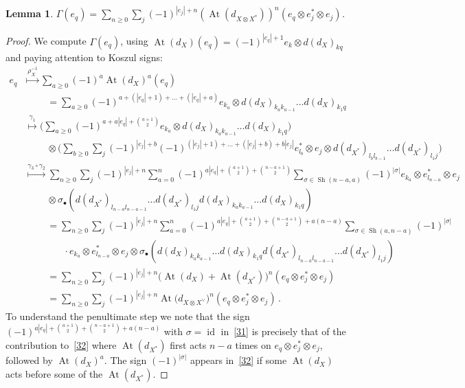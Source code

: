 \documentclass{compositio}
\newtheorem{lemma}[theorem]{Lemma}
\theoremstyle{definition}
\numberwithin{equation}{section}
\DeclareMathOperator{\At}{At}
\DeclareMathOperator{\Sh}{Sh}
\begin{document}
\begin{lemma}
$\Gamma(e_q) = \sum_{n\geq 0} \sum_j (-1)^{|e_j| + n} (\At(d_{X\otimes X^*}))^n(e_q \otimes e_j^* \otimes e_j)$. 
\end{lemma}

\begin{proof}
We compute $\Gamma(e_q)$, using $\At(d_X)(e_q) = (-1)^{|e_q|+1} e_k \otimes d(d_X)_{kq}$ and paying attention to Koszul signs: 
\begin{align}
e_q & \stackrel{\rho_X^{-1}}{\longmapsto} \sum_{a\geq 0} (-1)^a \At(d_X)^a(e_q) \nonumber \\
& \qquad\; = \sum_{a\geq 0} (-1)^{a + (|e_q|+1)+\ldots+(|e_q|+a)} e_{k_a} \otimes d(d_X)_{k_a k_{a-1}} \ldots d(d_X)_{k_1 q} \nonumber \\
& \stackrel{\gamma_1}{\longmapsto} \Big( \sum_{a\geq 0} (-1)^{a + a|e_q| + {a+1\choose 2}} e_{k_a} \otimes d(d_X)_{k_a k_{a-1}} \ldots d(d_X)_{k_1 q} \Big) \nonumber \\
& \qquad\; \otimes \Big( \sum_{b\geq 0} \sum_j (-1)^{|e_j|+b} (-1)^{(|e_j|+1)+\ldots+(|e_j|+b) + b|e_j|} e^*_{l_b} \otimes e_j \otimes d(d_{X^*})_{l_b l_{b-1}} \ldots d(d_{X^*})_{l_1 j} \Big) \nonumber \\
& \stackrel{\gamma_3 \circ \gamma_2}{\longmapsto} \sum_{n\geq 0} \sum_j (-1)^{|e_j|+n} \sum_{a=0}^n(-1)^{a|e_q| + {a+1\choose 2} + {n-a+1\choose 2}} \sum_{\sigma \in \Sh(n-a,a)} (-1)^{|\sigma|} e_{k_a} \otimes e^*_{l_{n-a}} \otimes e_j \nonumber \\
& \qquad\;   \otimes \sigma_\bullet \left( d(d_{X^*})_{l_{n-a} l_{n-a-1}} \ldots d(d_{X^*})_{l_1 j} d(d_X)_{k_a k_{a-1}} \ldots d(d_X)_{k_1 q} \right) \nonumber \\
& \qquad\; =  \sum_{n\geq 0} \sum_j (-1)^{|e_j|+n} \sum_{a=0}^n (-1)^{a|e_q| + {a+1\choose 2} + {n-a+1\choose 2} + a(n-a)} \sum_{\sigma \in \Sh(a,n-a)} (-1)^{|\sigma|}  \label{31} \\
& \qquad\qquad \cdot e_{k_a} \otimes e^*_{l_{n-a}} \otimes e_j \otimes \sigma_\bullet \left( d(d_X)_{k_a k_{a-1}} \ldots d(d_X)_{k_1 q} d(d_{X^*})_{l_{n-a} l_{n-a-1}} \ldots d(d_{X^*})_{l_1 j} \right) \nonumber \\
& \qquad\; =  \sum_{n\geq 0} \sum_j (-1)^{|e_j|+n} \big( \At(d_X) + \At(d_{X^*}) \big)^n (e_q \otimes e^*_j \otimes e_j) \label{32} \\
& \qquad\; =  \sum_{n\geq 0} \sum_j (-1)^{|e_j|+n} \At(d_{X\otimes X^\vee} \big)^n (e_q \otimes e^*_j \otimes e_j) \, . \nonumber
\end{align}
To understand the penultimate step we note that the sign $(-1)^{a|e_q| + {a+1\choose 2} + {n-a+1\choose 2} + a(n-a)}$ with $\sigma=\operatorname{id}$ in~\eqref{31} is precisely that of the contribution to~\eqref{32} where $\At(d_{X^*})$ first acts $n-a$ times on $e_q\otimes e^*_j\otimes e_j$, followed by $\At(d_X)^a$. The sign $(-1)^{|\sigma|}$ appears in~\eqref{32} if some $\At(d_X)$ acts before some of the $\At(d_{X^*})$. 
\end{proof}
\end{document}
